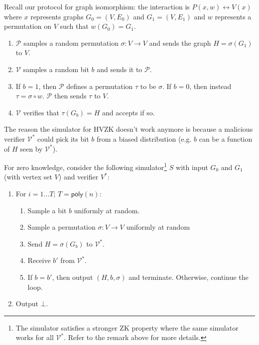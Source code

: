 Recall our protocol for graph isomorphism: the interaction is $P(x,w) \leftrightarrow V(x)$ where $x$ represents graphs $G_0 = (V, E_0)$ and $G_1 = (V, E_1)$ and $w$ represents a permutation on $V$ such that $w (G_0) = G_1$.

\begin{enumerate}
\item $\mathcal{P}$ samples a random permutation $\sigma: V \to V$ and sends the graph $H = \sigma(G_1)$ to $V$.

\item $\mathcal{V}$ samples a random bit $b$ and sends it to $\mathcal{P}$.

\item If $b = 1$, then $\mathcal{P}$ defines a permutation $\tau$ to be $\sigma$. If $b = 0$, then instead $\tau = \sigma \circ w$. $\mathcal{P}$ then sends $\tau$ to $V$.

\item $\mathcal{V}$ verifies that $\tau(G_b) = H$ and accepts if so.

\end{enumerate}

The reason the simulator for HVZK doesn't work anymore is because a malicious verifier $\mathcal{V^*}$ could pick its bit $b$ from a biased distribution (e.g. $b$ can be a function of $H$ seen by $\mathcal{V^*}$).

For zero knowledge, consider the following simulator\footnote{The simulator satisfies a stronger ZK property where the same simulator works for all $\mathcal{V^*}$. Refer to the remark above for more details.} $S$ with input $G_0$ and $G_1$ (with vertex set $V$) and verifier $V^*$:

\begin{enumerate}
\item For $i = 1\dots T$; $T=\mathsf{poly}(n)$:
\begin{enumerate}
	\item Sample a bit $b$ uniformly at random.

	\item Sample a permutation $\sigma: V \to V$ uniformly at random
	
	\item Send $H = \sigma (G_b)$ to $\mathcal{V^*}$.

	\item Receive $b'$ from $\mathcal{V^*}$.

	\item If $b=b'$, then output $(H, b, \sigma)$ and terminate. Otherwise, continue the loop.
\end{enumerate}
\item Output $\bot$.

\end{enumerate}

